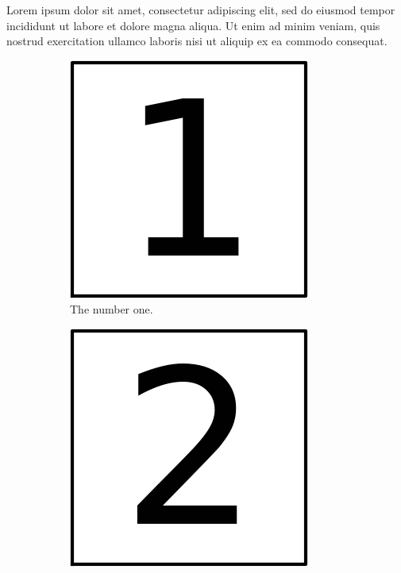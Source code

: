 Lorem ipsum dolor sit amet, consectetur adipiscing elit, sed do eiusmod
tempor incididunt ut labore et dolore magna aliqua. Ut enim ad minim
veniam, quis nostrud exercitation ullamco laboris nisi ut aliquip ex ea
commodo consequat.

\begin{figure}
  \centering
  \begin{subfigure}[b]{0.3\textwidth}
    \centering
    \includegraphics[width=\textwidth]{img/fig-1.png}
    \caption{The number one.}
    \label{fig:1a}
  \end{subfigure}
  \begin{subfigure}[b]{0.3\textwidth}
    \centering
    \includegraphics[width=\textwidth]{img/fig-2.png}

\end{subfigure}
\end{figure}
